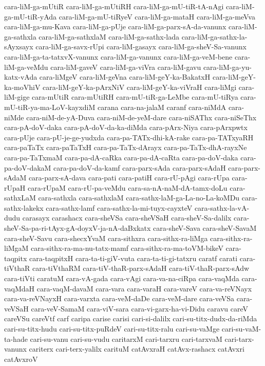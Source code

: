 {cara-liM-ga-mUtiR
cara-liM-ga-mUtiRH
cara-liM-ga-mU-tiR-tA-nAgi
cara-liM-ga-mU-tiR-yAda
cara-liM-ga-mU-tiRyeV
cara-liM-ga-mataH
cara-liM-ga-meVva
cara-liM-ga-mu-Kava
cara-liM-ga-pUje
cara-liM-ga-parx-sA-da-vanunx
cara-liM-ga-sathxla
cara-liM-ga-sathxlaM
cara-liM-ga-sathx-lada
cara-liM-ga-sathx-la-sAyxsayx
cara-liM-ga-savx-rUpi
cara-liM-gasayx
cara-liM-ga-sheV-Sa-vanunx
cara-liM-ga-ta-tatxvX-vanunx
cara-liM-ga-vanunx
cara-liM-ga-veM-bene
cara-liM-ga-veMdu
cara-liM-gaveV
cara-liM-ga-viVra
cara-liM-gavu
cara-liM-ga-yu-katx-vAda
cara-liMgeV
cara-liM-geVna
cara-liM-geY-ka-BakatxH
cara-liM-geY-ka-moVhiV
cara-liM-geY-ka-pArxNiV
cara-liM-geY-ka-viVraH
cara-liMgi
cara-liM-gige
cara-mUtiR
cara-mUtiRH
cara-mU-tiR-ga-LeMbe
cara-mU-tiRya
cara-mU-tiR-ya-ma-LoV-kayxdiM
carana
cara-na-jalaM
caranf
cara-niMdA
cara-niMde
cara-niM-de-yA-Duva
cara-niM-de-yeM-dare
cara-niSAThx
cara-niSeThx
cara-pA-doV-daka
cara-pA-doV-da-ka-diMda
cara-pArx-Niya
cara-pArxpwtx
cara-pUje
cara-pU-je-ge-yudxda
cara-pa-TATx-dhi-kA-rake
cara-pa-TATxyaRH
cara-paTaTx
cara-paTaTxH
cara-pa-TaTx-dArayx
cara-pa-TaTx-dhA-rayxNe
cara-pa-TaTxmaM
cara-pa-dA-caRka
cara-pa-dA-caRta
cara-pa-doV-daka
cara-pa-doV-dakaM
cara-pa-doV-da-kamf
cara-parx-sAda
cara-parx-sAdaH
cara-parx-sAdaM
cara-parx-sA-dava
cara-pati
cara-patiH
cara-rU-pAgi
cara-rUpa
cara-rUpaH
cara-rUpaM
cara-rU-pa-veMdu
cara-sa-nA-naM-dA-tamx-doLu
cara-sathxLaM
cara-sathxla
cara-sathxlaM
cara-sathx-laM-ga-La-no-La-koMDu
cara-sathx-lakekx
cara-sathx-lamf
cara-sathx-la-mi-tuyx-cayxteV
cara-sathx-la-vA-dudu
carasayx
carashacx
cara-sheVSa
cara-sheVSaH
cara-sheV-Sa-dalilx
cara-sheV-Sa-pa-ri-tAyx-gA-doyxV-ja-nA-daBxkatx
cara-sheV-Sava
cara-sheV-SavaM
cara-sheV-Savu
cara-shecxYvaM
cara-sithxra
cara-sithx-ra-liMga
cara-sithx-ra-liMgaM
cara-sithx-ra-ma-nu-tatx-mamf
cara-sithx-ra-ma-toVM-bikeV
cara-taqpitx
cara-taqpitxH
cara-ta-ti-giV-vuta
cara-ta-ti-gi-tatxru
caratf
carati
cara-tiVthaR
cara-tiVthaRM
cara-tiV-thaR-parx-sAdaH
cara-tiV-thaR-parx-sAdw
cara-tiVti
caratuM
cara-vA-gada
cara-vAgi
cara-va-na-ciRpa
cara-vaqMda
cara-vaqMdaH
cara-vaqM-davaM
cara-vara
cara-varaH
cara-vareV
cara-va-reVNayx
cara-va-reVNayxH
cara-varxta
cara-veM-daDe
cara-veM-dare
cara-veVSa
cara-veVSaH
cara-veV-SamaM
cara-viV-sara
cara-vi-garx-ha-vi-Didu
caravu
careV
careVSu
careVtf
carf
caripa
carise
carisi
cari-si-dalilx
cari-su-titx-dudx-da-riMda
cari-su-titx-hudu
cari-su-titx-puRdeV
cari-su-titx-ralu
cari-su-vaMge
cari-su-vaM-ta-hade
cari-su-vanu
cari-su-vudu
caritarxM
cari-tarxru
cari-tarxvaM
cari-tarx-vanunx
cariterx
cari-terx-yalilx
carituM
catAvxraH
catAvx-rashacx
catAvxri
catAvxroV
}

